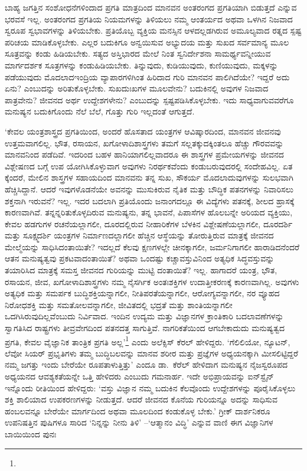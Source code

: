 ಬಾಹ್ಯ ಜಗತ್ತಿನ ಸಂಶೋಧನೆಗಳಿಂದಾದ ಪ್ರಗತಿ ಮಾತ್ರದಿಂದ ಮಾನವನ ಅಂತರಂಗದ ಪ್ರಗತಿಯಾಗಿ ಬಿಡುತ್ತದೆ ಎನ್ನುವ ಭರವಸೆ ಇಲ್ಲ. ಅಂತರಂಗದ ಪ್ರಗತಿಯ ನಿಯಮಗಳನ್ನು ತಿಳಿಯಲು ನಮ್ಮ ಆಂತರ್ಯದ ಅಥವಾ ಒಳಗಿನ ನಿಜವಾದ ಸ್ವರೂಪ ಸ್ವಭಾವಗಳನ್ನು ತಿಳಿಯಬೇಕು. ಪ್ರತಿಯೊಬ್ಬ ವ್ಯಕ್ತಿಯ ಮನಸ್ಸಿನ ಆಳದಲ್ಲಡಗಿರುವ ಅಮೂಲ್ಯವಾದ ರತ್ನದ ಸ್ಪಷ್ಟ ಪರಿಚಯ ಮಾಡಿಕೊಳ್ಳಬೇಕು. ಎಲ್ಲರ ಬದುಕಿಗೂ ಅನ್ವಯಿಸುವ ಅಭ್ಯುದಯ ಮತ್ತು ಸುಖದ ಸರ್ವಮಾನ್ಯ ಮೂಲ ಸೂತ್ರವನ್ನು ಕಂಡು ಹಿಡಿಯಬೇಕು. ಸತ್ಯದ ಅಸ್ತಿಭಾರದ ಮೇಲೆ ನಿಂತ ಸ್ವನಿರ್ದೇಶನಾ ಸಾಮರ್ಥ್ಯವನ್ನೀಯುವ ಮಾರ್ಗದರ್ಶಕ ಸೂತ್ರಗಳನ್ನು ಕಂಡುಹಿಡಿಯಬೇಕು. ತಿನ್ನುವುದು, ಕುಡಿಯುವುದು, ಕುಣಿಯುವುದು, ಮಕ್ಕಳನ್ನು ಪಡೆಯುವುದು ಮೊದಲಾದ\break ಇಂದ್ರಿಯ ವ್ಯಾಪಾರಗಳಿಗಿಂತ ಹಿರಿದಾದ ಗುರಿ ಮಾನವನ ಪಾಲಿಗಿದೆಯೇ? ಇದ್ದರೆ ಅದು ಏನು? ಎಂಬುದನ್ನು ಅರಿತುಕೊಳ್ಳಬೇಕು. ಸುಖದುಃಖಗಳ ಮೂಲವೇನು? ಬದುಕಿನಲ್ಲಿ ಅವುಗಳ ನಿಜವಾದ ಪಾತ್ರವೇನು? ಜೀವನದ ಅರ್ಥ ಉದ್ದೇಶಗಳೇನು? ಎಂಬುದನ್ನು ಸ್ಪಷ್ಟಪಡಿಸಿಕೊಳ್ಳಬೇಕು. ಇದು ಸಾಧ್ಯವಾಗುವವರೆಗೂ ಮನುಷ್ಯನ ಬದುಕಿಗೊಂದು ನೆಲೆ ಬೆಲೆ, ಗೊತ್ತು ಗುರಿ ಇಲ್ಲದಂತೆ ಆಗುತ್ತದೆ.

‘ಕೇವಲ ಯಂತ್ರಶಾಸ್ತ್ರದ ಪ್ರಗತಿಯಿಂದ, ಅಂದರೆ ಹೊಸತಾದ ಯಂತ್ರಗಳ ಆವಿಷ್ಕಾರದಿಂದ, ಮಾನವನ ಜೀವನವು ಉತ್ತಮವಾಗಲಿಲ್ಲ. ಭೌತ, ರಸಾಯನ, ಖಗೋಳಾದಿಶಾಸ್ತ್ರಗಳು ತಮಗೆ ಸಲ್ಲತಕ್ಕುದಕ್ಕಿಂತಲೂ ಹೆಚ್ಚು ಗೌರವವನ್ನು ಮಾನವನಿಂದ ಪಡೆದಿವೆ. ಇದರಿಂದ ಬಹಳ ಹಾನಿಯಾಗಲಿಲ್ಲವಾದರೂ ಈ ಶಾಸ್ತ್ರಗಳ ಪ್ರಮೇಯಗಳನ್ನು ಜೀವನದ ವಿಶ್ಲೇಷಣದ ಬಗ್ಗೆ ಉಪ ಯೋಗಿಸಿಕೊಳ್ಳುವಾಗ ಅವುಗಳು ನಿರರ್ಥಕವೆಂದು ಕಂಡುಬರುವುದರಲ್ಲಿ ಸಂದೇಹವಿಲ್ಲ. ಏತ ಕ್ಕೆಂದರೆ, ಮೇಲಿನ ಶಾಸ್ತ್ರಗಳ ಸಹಾಯದಿಂದ ಮಾನವನು ತನ್ನ ಸುಖ, ಸೌಕರ್ಯ ಮೊದಲಾದುವುಗಳನ್ನು ಸುಲಭವಾಗಿ ಹೆಚ್ಚಿಸಿದ್ದಾನೆ. ಆದರೆ ಇವುಗಳೊಡನೆಯೇ ಅವನನ್ನು ಮುಸುಕಿರುವ ನೈತಿಕ ಮತ್ತು ಬೌದ್ಧಿಕ ಪತನಗಳನ್ನು ನಿವಾರಿಸಲು ಶಕ್ತನಾಗಿ ಇರುವನೆ? ಇಲ್ಲ. ಇದರ ಬದಲಾಗಿ ಪ್ರತಿಯೊಂದು ಜನಾಂಗದಲ್ಲೂ ಈ ವಿದ್ಯೆಗಳು ಪತನಕ್ಕೆ, ಶೀಲದ ಹ್ರಾಸಕ್ಕೆ ಕಾರಣವಾಗಿವೆ. ತನ್ನನ್ನರಿತುಕೊಳ್ಳದಿರುವ ಮನುಷ್ಯನು, ತನ್ನ ಭಾವನೆ, ಪಿಪಾಸೆಗಳ ಹೊಲಬನ್ನೇ ಅರಿಯದ ವ್ಯಕ್ತಿಯು, ಕೇವಲ ಹಡಗುಗಳ ರಚನೆಯಲ್ಲಾಗಲೀ, ದೂರದಲ್ಲಿರುವ ನೀಹಾರಿಕೆಗಳ ಬೆಳಕಿನ ವಿಶ್ಲೇಷಣೆಯಲ್ಲಾಗಲೀ, ದೂರದರ್ಶಿ ಮತ್ತು ಸೂಕ್ಷ್ಮದರ್ಶಿ ಯಂತ್ರಗಳ ನಿರ್ಮಾಣದಲ್ಲಾಗಲೀ ಹೆಚ್ಚಿನ ಆಸ್ಥೆಯನ್ನು ತೋರುತ್ತಿರುವ ಮಾತ್ರಕ್ಕೆ ಜೀವನದ ಮೇಲ್ಮೆಯನ್ನು ಸಾಧಿಸಿದಂತಾಯಿತೇ? ಇದಲ್ಲದೆ ಕೆಲವು ಕ್ಷಣಗಳಲ್ಲೇ ಚೀನಕ್ಕಾಗಲೀ, ಜರ್ಮನಿಗಾಗಲೀ ಹಾರಾಡಿದನೆಂದರೆ ಆತನ ಮನುಷ್ಯತ್ವವು ಪ್ರಕಟವಾದಂತಾಯಿತೆ? ಅಥವಾ ಒಂದಷ್ಟು ಕಚ್ಚಾವಸ್ತುವಿನಿಂದ ಅತ್ಯಧಿಕ ಸಿದ್ಧವಸ್ತುವನ್ನು ತಯಾರಿಸಿದ ಮಾತ್ರಕ್ಕೆ ಸಮಸ್ತ ಜೀವನದ ಗುರಿಯನ್ನು ಮುಟ್ಟಿ ದಂತಾಯಿತೆ? ಇಲ್ಲ. ಹಾಗಾದರೆ ಯಂತ್ರ, ಭೌತ, ರಸಾಯನ, ಜೀವ, ಖಗೋಳಾದಿಶಾಸ್ತ್ರಗಳು ನಮ್ಮ ನೈಸರ್ಗಿಕ ಅಂತಃಶಕ್ತಿಗಳ ಉದಾತ್ತೀಕರಣಕ್ಕೆ ಕಾರಣವಾಗಿಲ್ಲ. ಅವುಗಳು ಅತ್ಯಧಿಕ ಮತ್ತು ಸಮರ್ಪಕ ಬುದ್ಧಿಶಕ್ತಿಯನ್ನಾಗಲೀ, ನೀತಿಪರತೆಯನ್ನಾಗಲೀ, ಆರೋಗ್ಯವನ್ನಾಗಲೀ, ನರ ವ್ಯೂಹದ ನಿರೋಧಶಕ್ತಿ ಮತ್ತು ಸಮತೋಲವನ್ನಾಗಲೀ, ಜೀವಿತದಲ್ಲಿ ಭದ್ರತೆ ಮತ್ತು ಶಾಂತಿಯನ್ನಾಗಲೀ ಒದಗಿಸಿರುವುದಿಲ್ಲವೆಂಬುದು ನಿರ್ವಿವಾದ. ಇಂದಿನ ಉದ್ಯಮ ಮತ್ತು ವಿಜ್ಞಾನಗಳ ಕ್ರಾಂತಿಕಾರಿ ಬದಲಾವಣೆಗಳನ್ನು ಸ್ವಾಗತಿಸಿದ ರಾಷ್ಟ್ರಗಳು ತೀವ್ರವೇಗದಿಂದ ಪತನದತ್ತ ಸಾಗುತ್ತಿವೆ. ನಾಗರಿಕತೆಯಿಂದ ಆಗಬೇಕಾದುದು ಮನುಷ್ಯತ್ವದ ಪ್ರಗತಿ, ಕೇವಲ ವೈಜ್ಞಾನಿಕ ತಾಂತ್ರಿಕ ಪ್ರಗತಿ ಅಲ್ಲ’\footnote{\hfill{}} ಎಂದು ಅಲೆಕ್ಸಿಸ್ ಕೆರಲ್ ಹೇಳಿದ್ದರು. ‘ಗೆಲಿಲಿಯೋ, ನ್ಯೂಟನ್, ಲೆವೋ ಸಿಯರ್ ಪ್ರಭೃತಿಗಳು ತಮ್ಮ ಬುದ್ಧಿಬಲವನ್ನು ಮಾನವ ಶರೀರ ಮತ್ತು ಪ್ರಜ್ಞೆಗಳ ಅಧ್ಯಯನಕ್ಕಾಗಿ ಮೀಸಲಿಟ್ಟಿದ್ದರೆ ನಮ್ಮ ಜಗತ್ತು ಇಂದು ಬೇರೆಯೇ ರೂಪತಾಳುತ್ತಿತ್ತು’ ಎಂದೂ ಡಾ.\ ಕೆರೆಲ್​ ಹೇಳಿದಾಗ ಮನುಷ್ಯನ ನೈಜಸ್ವರೂಪದ ಅಧ್ಯಯನದ ಆವಶ್ಯಕತೆಯನ್ನೇ ಒತ್ತಿ ಹೇಳಿದರು ಎಂಬುದು ಗಮನಾರ್ಹ. ಇದೇ ಅಭಿಪ್ರಾಯವನ್ನು ಐನ್​ಸ್ಟೈನ್ ಇನ್ನೊಂದು ರೀತಿಯಿಂದ ಹೇಳಿದ್ದರು: ‘ವಸ್ತು ವಿಜ್ಞಾನ ನಮ್ಮ ಬದುಕಿನ ಕೆಲವೊಂದು ಉದ್ದೇಶಗಳನ್ನು ಪೂರೈಸಿಕೊಳ್ಳಲು ಶಕ್ತಿ ಶಾಲಿಯಾದ ಉಪಕರಣಗಳನ್ನು ನೀಡುತ್ತದೆ. ಆದರೆ ಜೀವನದ ಕೊನೆಯ ಗುರಿಯನ್ನೂ ಅದನ್ನು ಸಾಧಿಸುವ ಹಂಬಲವನ್ನೂ ಬೇರೆಯೇ ಮಾರ್ಗದಿಂದ ಅಥವಾ ಮೂಲದಿಂದ ಕಂಡುಕೊಳ್ಳ ಬೇಕು.’ ಗ್ರೀಕ್ ದಾರ್ಶನಿಕರೂ ಉಪನಿಷತ್ತಿನ ಪುಷಿಗಳೂ ಸಾರಿದ ‘ನಿನ್ನನ್ನು ನೀನು ತಿಳಿ’ –‘ಆತ್ಮಾನಂ ವಿದ್ಧಿ’ ಎನ್ನುವ ವಾಣಿ ಈಗ ವಿಜ್ಞಾನಿಗಳ ಬಾಯಿಯಿಂದ ಪುನಃ 